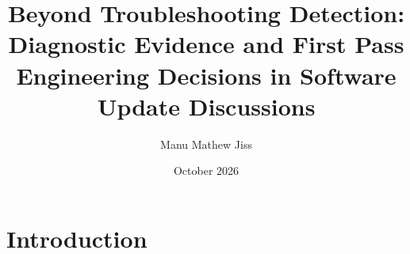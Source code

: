 \documentclass{article}
\title{Beyond Troubleshooting Detection: Diagnostic Evidence and First Pass Engineering Decisions in Software Update Discussions}
\author{Manu Mathew Jiss}
\date{October 2026}
\begin{document}
\maketitle
\section{Introduction}
\end{document}
